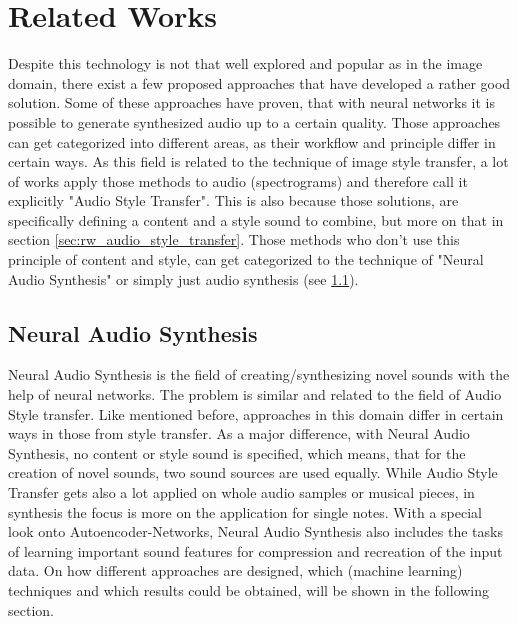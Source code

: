 \chapter{Related Works}

Despite this technology is not that well explored and popular as in the image domain, there exist a few proposed approaches that have developed a rather good solution. Some of these approaches have proven, that with neural networks it is possible to generate synthesized audio up to a certain quality. Those approaches can get categorized into different areas, as their workflow and principle differ in certain ways. As this field is related to the technique of image style transfer, a lot of works apply those methods to audio (spectrograms) and therefore call it explicitly "Audio Style Transfer". This is also because those solutions, are specifically defining a content and a style sound to combine, but more on that in section \ref{sec:rw_audio_style_transfer}. Those methods who don't use this principle of content and style, can get categorized to the technique of "Neural Audio Synthesis" or simply just audio synthesis (see \ref{sec:rw_neural_audio_synthesis}).

\section{Neural Audio Synthesis}
\label{sec:rw_neural_audio_synthesis}
Neural Audio Synthesis is the field of creating/synthesizing novel sounds with the help of neural networks. The problem is similar and related to the field of Audio Style transfer. Like mentioned before, approaches in this domain differ in certain ways in those from style transfer. As a major difference, with Neural Audio Synthesis, no content or style sound is specified, which means, that for the creation of novel sounds, two sound sources are used equally. While Audio Style Transfer gets also a lot applied on whole audio samples or musical pieces, in synthesis the focus is more on the application for single notes. With a special look onto Autoencoder-Networks, Neural Audio Synthesis also includes the tasks of learning important sound features for compression and recreation of the input data. On how different approaches are designed, which (machine learning) techniques and which results could be obtained, will be shown in the following section.\\


